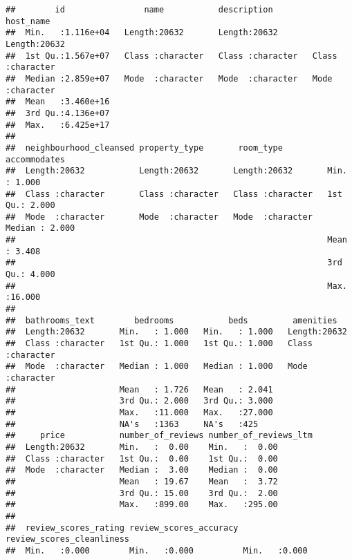 \documentclass[
]{article}
\begin{document}
\begin{verbatim}
##        id                name           description         host_name        
##  Min.   :1.116e+04   Length:20632       Length:20632       Length:20632      
##  1st Qu.:1.567e+07   Class :character   Class :character   Class :character  
##  Median :2.859e+07   Mode  :character   Mode  :character   Mode  :character  
##  Mean   :3.460e+16                                                           
##  3rd Qu.:4.136e+07                                                           
##  Max.   :6.425e+17                                                           
##                                                                              
##  neighbourhood_cleansed property_type       room_type          accommodates   
##  Length:20632           Length:20632       Length:20632       Min.   : 1.000  
##  Class :character       Class :character   Class :character   1st Qu.: 2.000  
##  Mode  :character       Mode  :character   Mode  :character   Median : 2.000  
##                                                               Mean   : 3.408  
##                                                               3rd Qu.: 4.000  
##                                                               Max.   :16.000  
##                                                                               
##  bathrooms_text        bedrooms           beds         amenities        
##  Length:20632       Min.   : 1.000   Min.   : 1.000   Length:20632      
##  Class :character   1st Qu.: 1.000   1st Qu.: 1.000   Class :character  
##  Mode  :character   Median : 1.000   Median : 1.000   Mode  :character  
##                     Mean   : 1.726   Mean   : 2.041                     
##                     3rd Qu.: 2.000   3rd Qu.: 3.000                     
##                     Max.   :11.000   Max.   :27.000                     
##                     NA's   :1363     NA's   :425                        
##     price           number_of_reviews number_of_reviews_ltm
##  Length:20632       Min.   :  0.00    Min.   :  0.00       
##  Class :character   1st Qu.:  0.00    1st Qu.:  0.00       
##  Mode  :character   Median :  3.00    Median :  0.00       
##                     Mean   : 19.67    Mean   :  3.72       
##                     3rd Qu.: 15.00    3rd Qu.:  2.00       
##                     Max.   :899.00    Max.   :295.00       
##                                                            
##  review_scores_rating review_scores_accuracy review_scores_cleanliness
##  Min.   :0.000        Min.   :0.000          Min.   :0.000            

\end{verbatim}
\end{document}
